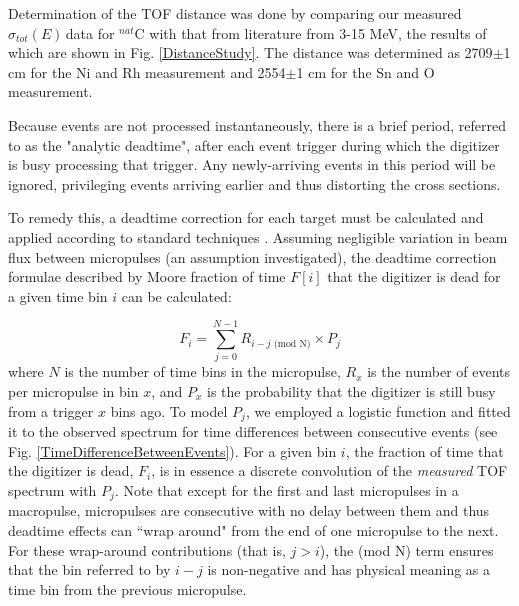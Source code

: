 \documentclass[twocolumn,secnumarabic,amssymb, nobibnotes, aps, prl,
superscriptaddress, nobalancelastpage]{revtex4}
\newcommand{\totEs}{\ensuremath{\sigma_{tot}(E)\,}}
\begin{document}
Determination of the TOF distance was done by comparing our measured \totEs data
for $^{nat}$C with that from literature from 3-15 MeV, the results of which are
shown in Fig. \ref{DistanceStudy}. The distance was determined as 2709$\pm$1 cm
for the Ni and Rh measurement and 2554$\pm$1 cm for the Sn and O measurement.

Because events are not processed instantaneously, there is a brief period,
referred to as the "analytic deadtime", after each event trigger during which
the digitizer is busy processing that trigger. Any newly-arriving events in this
period will be ignored, privileging events arriving earlier and thus distorting
the cross sections.

To remedy this, a deadtime correction for
each target must be calculated and applied according to standard techniques
\cite{Moore1980}. Assuming negligible variation in beam flux between micropulses
(an assumption investigated), the deadtime correction formulae described by
Moore
fraction of time $F[i]$ that the digitizer is dead for a given time bin $i$ can
be calculated:

\begin{equation}
    F_{i} = \sum^{N-1}_{j=0} R_{i-j\text{ (mod N)}}\times P_{j}
\end{equation}
where $N$ is the number of time bins in the micropulse, $R_{x}$ is the number of
events per micropulse in bin $x$, and $P_{x}$ is the probability that the
digitizer is still busy from a trigger $x$ bins ago. To model $P_{j}$, we
employed a logistic function and fitted it to the observed spectrum for time
differences between consecutive events (see Fig.
\ref{TimeDifferenceBetweenEvents}). For a given bin $i$, the fraction of time that the 
digitizer is dead, $F_{i}$, is in essence a discrete convolution of the
\textit{measured} TOF spectrum with $P_{j}$. Note that except for the first and
last micropulses in a macropulse, micropulses are
consecutive with no delay between them and thus deadtime effects can
``wrap around" from the end of one micropulse to the next. For these wrap-around
contributions (that is, $j>i$), the (mod N) term ensures that the bin referred
to by $i-j$ is non-negative and has physical meaning as a time bin from the previous 
micropulse.
\end{document}
